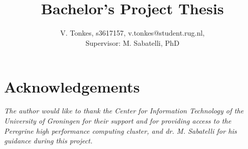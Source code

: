 \documentclass[10pt,a4paper,twocolumn]{article}
\title{\vspace{-0.5in}{\bfseries\scshape 
    Transfer Learning for computationally limited training of Vision Transformers on art classification tasks
    } \\ 
    \vspace{1ex} 
    \normalsize{Bachelor's Project Thesis}\vspace{-2ex}
}
\author{
    \normalsize{V. Tonkes, s3617157, v.tonkes@student.rug.nl,} \\ 
    \normalsize{Supervisor: M. Sabatelli, PhD}
}
\date{\vspace{-5ex}}
\begin{document}
\twocolumn[
  \maketitle
  \begin{@twocolumnfalse}
%   
  \end{@twocolumnfalse}
]

\thispagestyle{firststyle}



%


\section*{Acknowledgements}
\textit{The author would like to thank {the Center for Information Technology of the University of Groningen} for their support and for providing access to the Peregrine high performance computing cluster, and {dr. M. Sabatelli} for his guidance during this project.}






%    
%    
\end{document}
